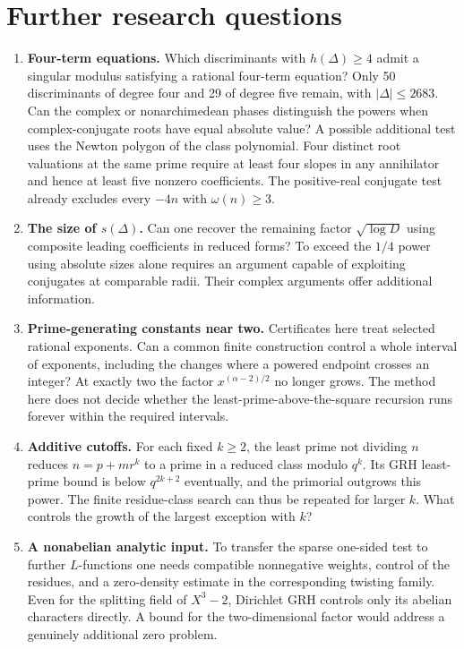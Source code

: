 \documentclass[11pt]{article}
\theoremstyle{remark}\newtheorem{remark}[theorem]{Remark}
\begin{document}
\section{Further research questions}
\begin{enumerate}
\item \textbf{Four-term equations.} Which discriminants with $h(\Delta)\ge4$ admit a singular modulus satisfying a rational four-term equation? Only 50 discriminants of degree four and 29 of degree five remain, with $|\Delta|\le2683$. Can the complex or nonarchimedean phases distinguish the powers when complex-conjugate roots have equal absolute value? A possible additional test uses the Newton polygon of the class polynomial. Four distinct root valuations at the same prime require at least four slopes in any annihilator and hence at least five nonzero coefficients. The positive-real conjugate test already excludes every $-4n$ with $\omega(n)\ge3$.
\item \textbf{The size of $s(\Delta)$.} Can one recover the remaining factor $\sqrt{\log D}$ using composite leading coefficients in reduced forms? To exceed the $1/4$ power using absolute sizes alone requires an argument capable of exploiting conjugates at comparable radii. Their complex arguments offer additional information.
\item \textbf{Prime-generating constants near two.} Certificates here treat selected rational exponents. Can a common finite construction control a whole interval of exponents, including the changes where a powered endpoint crosses an integer? At exactly two the factor $x^{(\alpha-2)/2}$ no longer grows. The method here does not decide whether the least-prime-above-the-square recursion runs forever within the required intervals.
\item \textbf{Additive cutoffs.} For each fixed $k\ge2$, the least prime not dividing $n$ reduces $n=p+mr^k$ to a prime in a reduced class modulo $q^k$. Its GRH least-prime bound is below $q^{2k+2}$ eventually, and the primorial outgrows this power. The finite residue-class search can thus be repeated for larger $k$. What controls the growth of the largest exception with $k$?
\item \textbf{A nonabelian analytic input.} To transfer the sparse one-sided test to further $L$-functions one needs compatible nonnegative weights, control of the residues, and a zero-density estimate in the corresponding twisting family. Even for the splitting field of $X^3-2$, Dirichlet GRH controls only its abelian characters directly. A bound for the two-dimensional factor would address a genuinely additional zero problem.
\end{enumerate}
\end{document}
